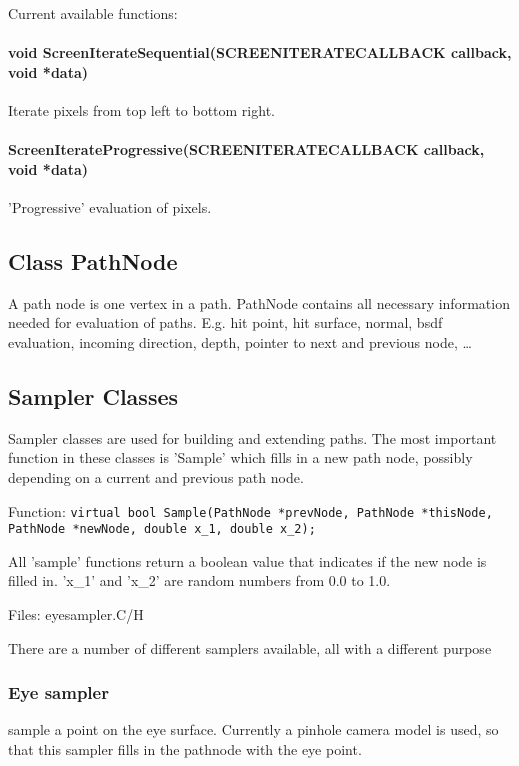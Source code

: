 \documentclass[11pt]{report}
\begin{document}
Current available functions:

\paragraph{void ScreenIterateSequential(SCREENITERATECALLBACK callback, void *data)}

Iterate pixels from top left to bottom right.

\paragraph{ScreenIterateProgressive(SCREENITERATECALLBACK callback, 
			      void *data)}

'Progressive' evaluation of pixels. 


\subsection{Class PathNode}

A path node is one vertex in a path. PathNode contains
all necessary information needed for evaluation of paths.
E.g. hit point, hit surface, normal, bsdf evaluation,
incoming direction, depth, pointer to next and previous node, \ldots

\subsection{Sampler Classes}

Sampler classes are used for building and extending paths.
The most important function in these classes is 'Sample'
which fills in a new path node, possibly depending on a
current and previous path node.

Function:
{\tt virtual bool Sample(PathNode *prevNode, PathNode *thisNode,
  PathNode *newNode, double x\_1, double x\_2); }


All 'sample' functions return a boolean value that indicates if
the new node is filled in. 'x\_1' and 'x\_2' are random numbers from
0.0 to 1.0.

Files: eyesampler.C/H


There are a number of different samplers available, all with
a different purpose


\subsubsection{Eye sampler}

sample a point on the eye surface. Currently a pinhole
camera model is used, so that this sampler fills in the pathnode
with the eye point.
\end{document}
